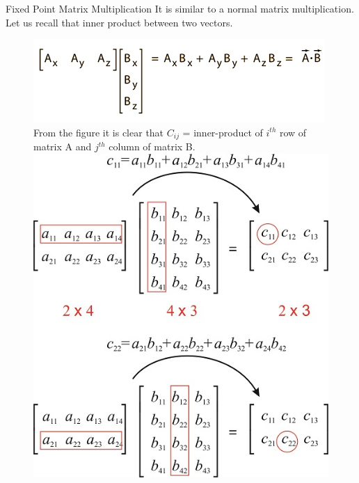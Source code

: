 \documentclass[10pt]{beamer}
\begin{document}
\begin{frame}[fragile]{Fixed Point Matrix Multiplication}
It is similar to a normal matrix multiplication. Let us recall that inner product between two vectors.
  \begin{figure}
    \includegraphics[scale=0.3]{vector.png}
\\From the figure it is clear that $C_{ij}$  = inner-product of $i^{th}$ row of matrix A and $j^{th}$ column of matrix B. \\
    \includegraphics[scale=1]{matmul.jpg}
\end{figure}
\end{frame}
\end{document}

